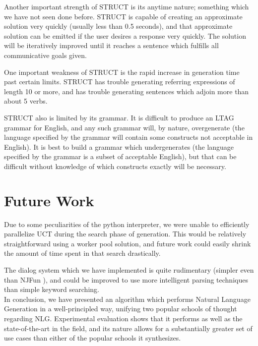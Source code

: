 Another important strength of STRUCT is its anytime nature; something which
we have not seen done before.  STRUCT is capable of creating an approximate
solution very quickly (usually less than 0.5 seconds), and that approximate solution
can be emitted if the user desires a response very quickly.  The solution will be iteratively
improved until it reaches a sentence which fulfills all communicative goals given.

One important weakness of STRUCT is the rapid increase in generation time
past certain limits.  STRUCT has trouble generating referring expressions of
length 10 or more, and has trouble generating sentences which adjoin
more than about 5 verbs.

STRUCT also is limited by its grammar.  It is difficult to produce an LTAG grammar
for English, and any such grammar will, by nature, overgenerate (the language
specified by the grammar will contain some constructs not acceptable in
English).  It is best to build a grammar which undergenerates (the language
specified by the grammar is a subset of acceptable English), but that can
be difficult without knowledge of which constructs exactly will be necessary.

\section{Future Work}

Due to some peculiarities of the python interpreter, we were unable to
efficiently parallelize UCT during the search phase of generation.  This
would be relatively straightforward using a worker pool solution, and future
work could easily shrink the amount of time spent in that search drastically.

The dialog system which we have implemented is quite rudimentary
(simpler even than NJFun \cite{litman_njfun_2000}), and could
be improved to use more intelligent parsing techniques than simple
keyword searching.\\


In conclusion, we have presented an algorithm which performs Natural Language
Generation in a well-principled way, unifying two popular schools of thought regarding
NLG.  Experimental evaluation shows that it performs as well as the state-of-the-art in
the field, and its nature allows for a substantially greater set of use cases than either
of the popular schools it synthesizes.